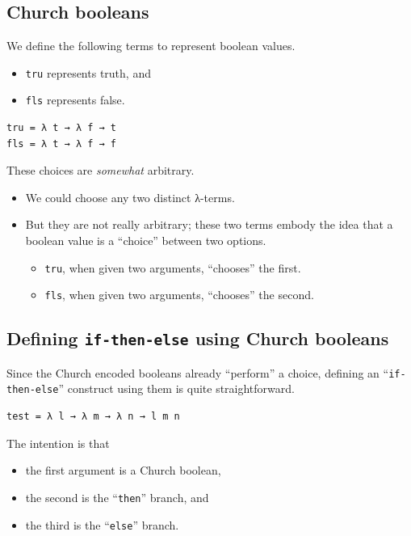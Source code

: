 \documentclass[11pt]{article}
\theoremstyle{definition}
\begin{document}
\subsection{Church booleans}
\label{sec:org0caa518}

We define the following terms to represent boolean values.
\begin{itemize}
\item \texttt{tru} represents truth, and
\item \texttt{fls} represents false.
\end{itemize}
\begin{verbatim}
tru = λ t → λ f → t
fls = λ t → λ f → f
\end{verbatim}

These choices are \emph{somewhat} arbitrary.
\begin{itemize}
\item We could choose any two distinct λ-terms.
\item But they are not really arbitrary;
these two terms embody the idea that a boolean value
is a “choice” between two options.
\begin{itemize}
\item \texttt{tru}, when given two arguments, “chooses” the first.
\item \texttt{fls}, when given two arguments, “chooses” the second.
\end{itemize}
\end{itemize}

\subsection{Defining \texttt{if-then-else} using Church booleans}
\label{sec:org21b7c0b}

Since the Church encoded booleans already “perform” a choice,
defining an “\texttt{if-then-else}” construct
using them is quite straightforward.
\begin{verbatim}
test = λ l → λ m → λ n → l m n
\end{verbatim}
The intention is that
\begin{itemize}
\item the first argument is a Church boolean,
\item the second is the “\texttt{then}” branch, and
\item the third is the “\texttt{else}” branch.
\end{itemize}
\end{document}
